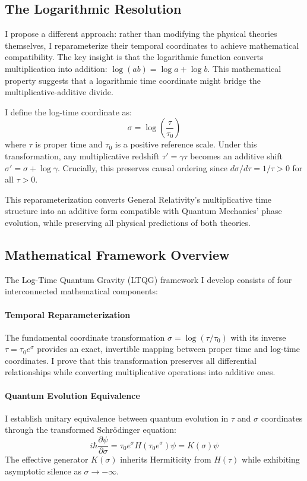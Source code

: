 \subsection{The Logarithmic Resolution}

I propose a different approach: rather than modifying the physical theories themselves, I reparameterize their temporal coordinates to achieve mathematical compatibility. The key insight is that the logarithmic function converts multiplication into addition: $\log(ab) = \log a + \log b$. This mathematical property suggests that a logarithmic time coordinate might bridge the multiplicative-additive divide.

I define the log-time coordinate as:
\begin{equation}
\sigma = \log\left(\frac{\tau}{\tau_0}\right)
\end{equation}
where $\tau$ is proper time and $\tau_0$ is a positive reference scale. Under this transformation, any multiplicative redshift $\tau' = \gamma \tau$ becomes an additive shift $\sigma' = \sigma + \log \gamma$. Crucially, this preserves causal ordering since $d\sigma/d\tau = 1/\tau > 0$ for all $\tau > 0$.

This reparameterization converts General Relativity's multiplicative time structure into an additive form compatible with Quantum Mechanics' phase evolution, while preserving all physical predictions of both theories.

\subsection{Mathematical Framework Overview}

The Log-Time Quantum Gravity (LTQG) framework I develop consists of four interconnected mathematical components:

\paragraph{Temporal Reparameterization} The fundamental coordinate transformation $\sigma = \log(\tau/\tau_0)$ with its inverse $\tau = \tau_0 e^\sigma$ provides an exact, invertible mapping between proper time and log-time coordinates. I prove that this transformation preserves all differential relationships while converting multiplicative operations into additive ones.

\paragraph{Quantum Evolution Equivalence} I establish unitary equivalence between quantum evolution in $\tau$ and $\sigma$ coordinates through the transformed Schrödinger equation:
\begin{equation}
i\hbar \frac{\partial \psi}{\partial \sigma} = \tau_0 e^\sigma H(\tau_0 e^\sigma) \psi = K(\sigma) \psi
\end{equation}
The effective generator $K(\sigma)$ inherits Hermiticity from $H(\tau)$ while exhibiting asymptotic silence as $\sigma \to -\infty$.

